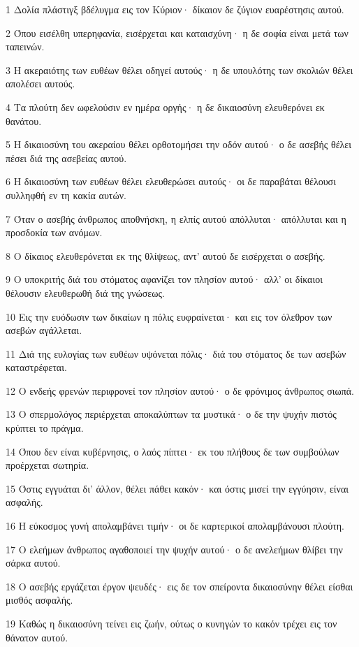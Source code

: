 \par 1 Δολία πλάστιγξ βδέλυγμα εις τον Κύριον· δίκαιον δε ζύγιον ευαρέστησις αυτού.
\par 2 Όπου εισέλθη υπερηφανία, εισέρχεται και καταισχύνη· η δε σοφία είναι μετά των ταπεινών.
\par 3 Η ακεραιότης των ευθέων θέλει οδηγεί αυτούς· η δε υπουλότης των σκολιών θέλει απολέσει αυτούς.
\par 4 Τα πλούτη δεν ωφελούσιν εν ημέρα οργής· η δε δικαιοσύνη ελευθερόνει εκ θανάτου.
\par 5 Η δικαιοσύνη του ακεραίου θέλει ορθοτομήσει την οδόν αυτού· ο δε ασεβής θέλει πέσει διά της ασεβείας αυτού.
\par 6 Η δικαιοσύνη των ευθέων θέλει ελευθερώσει αυτούς· οι δε παραβάται θέλουσι συλληφθή εν τη κακία αυτών.
\par 7 Όταν ο ασεβής άνθρωπος αποθνήσκη, η ελπίς αυτού απόλλυται· απόλλυται και η προσδοκία των ανόμων.
\par 8 Ο δίκαιος ελευθερόνεται εκ της θλίψεως, αντ' αυτού δε εισέρχεται ο ασεβής.
\par 9 Ο υποκριτής διά του στόματος αφανίζει τον πλησίον αυτού· αλλ' οι δίκαιοι θέλουσιν ελευθερωθή διά της γνώσεως.
\par 10 Εις την ευόδωσιν των δικαίων η πόλις ευφραίνεται· και εις τον όλεθρον των ασεβών αγάλλεται.
\par 11 Διά της ευλογίας των ευθέων υψόνεται πόλις· διά του στόματος δε των ασεβών καταστρέφεται.
\par 12 Ο ενδεής φρενών περιφρονεί τον πλησίον αυτού· ο δε φρόνιμος άνθρωπος σιωπά.
\par 13 Ο σπερμολόγος περιέρχεται αποκαλύπτων τα μυστικά· ο δε την ψυχήν πιστός κρύπτει το πράγμα.
\par 14 Όπου δεν είναι κυβέρνησις, ο λαός πίπτει· εκ του πλήθους δε των συμβούλων προέρχεται σωτηρία.
\par 15 Όστις εγγυάται δι' άλλον, θέλει πάθει κακόν· και όστις μισεί την εγγύησιν, είναι ασφαλής.
\par 16 Η εύκοσμος γυνή απολαμβάνει τιμήν· οι δε καρτερικοί απολαμβάνουσι πλούτη.
\par 17 Ο ελεήμων άνθρωπος αγαθοποιεί την ψυχήν αυτού· ο δε ανελεήμων θλίβει την σάρκα αυτού.
\par 18 Ο ασεβής εργάζεται έργον ψευδές· εις δε τον σπείροντα δικαιοσύνην θέλει είσθαι μισθός ασφαλής.
\par 19 Καθώς η δικαιοσύνη τείνει εις ζωήν, ούτως ο κυνηγών το κακόν τρέχει εις τον θάνατον αυτού.

